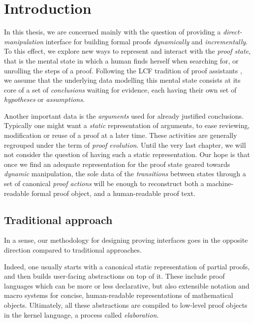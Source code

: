 \setchapterpreamble[u]{\margintoc}
\chapter{Introduction}

In this thesis, we are concerned mainly with the question of providing a
\emph{direct-manipulation} interface for building formal proofs
\emph{dynamically} and \emph{incrementally}. To this effect, we explore new ways
to represent and interact with the \emph{proof state}, that is the mental state
in which a human finds herself when searching for, or unrolling the steps of a
proof. Following the LCF tradition of proof assistants
\cite{doi:10.1098/rsta.1984.0067}, we assume that the underlying data modelling
this mental state consists at its core of a set of \emph{conclusions} waiting
for evidence, each having their own set of \emph{hypotheses} or
\emph{assumptions}.

Another important data is the \emph{arguments} used for already justified
conclusions. Typically one might want a \emph{static} representation of
arguments, to ease reviewing, modification or reuse of a proof at a later time.
These activities are generally regrouped under the term of \emph{proof
evolution}. Until the very last chapter, we will not consider the question of
having such a static representation. Our hope is that once we find an adequate
representation for the proof state geared towards \emph{dynamic} manipulation,
the sole data of the \emph{transitions} between states through a set of
canonical \emph{proof actions} will be enough to reconstruct both a
machine-readable formal proof object, and a human-readable proof text.

\section{Traditional approach}

In a sense, our methodology for designing proving interfaces goes in the
opposite direction compared to traditional approaches.

Indeed, one usually starts with a canonical static representation of partial
proofs, and then builds user-facing abstractions on top of
it. These include proof languages which can be more or less
declarative, but also extensible
notation and macro systems \cite{ullrich_beyond_2022} for concise,
human-readable representations of mathematical objects. Ultimately, all these
abstractions are compiled to low-level proof objects in the kernel language, a
process called \emph{elaboration}.

